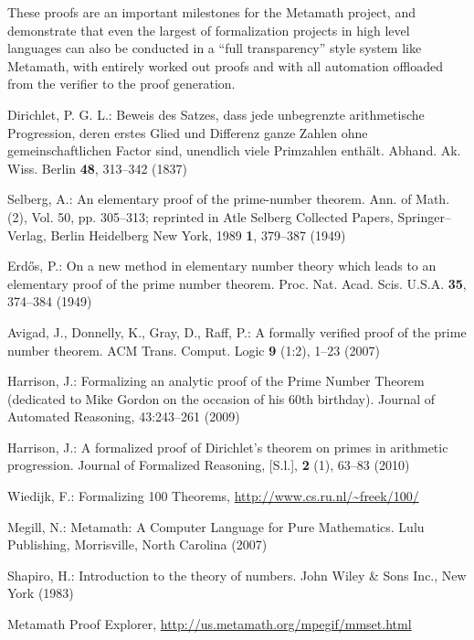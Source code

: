 \documentclass[runningheads,a4paper]{llncs}
\begin{document}
These proofs are an important milestones for the Metamath project, and demonstrate that even the largest of formalization projects in high level languages can also be conducted in a ``full transparency'' style system like Metamath, with entirely worked out proofs and with all automation offloaded from the verifier to the proof generation.


\begin{thebibliography}{4}
 Dirichlet, P. G. L.: Beweis des Satzes, dass jede unbegrenzte arithmetische Progression, deren erstes Glied und Differenz ganze Zahlen ohne gemeinschaftlichen Factor sind, unendlich viele Primzahlen enth\"{a}lt. Abhand. Ak. Wiss. Berlin {\bf 48}, 313--342 (1837)

 Selberg, A.: An elementary proof of the prime-number theorem. Ann. of Math. (2), Vol. 50, pp. 305--313; reprinted in Atle Selberg Collected Papers, Springer--Verlag, Berlin Heidelberg New York, 1989 {\bf 1}, 379--387 (1949)

 Erd\H{o}s, P.: On a new method in elementary number theory which leads to an elementary proof of the prime number theorem. Proc. Nat. Acad. Scis. U.S.A. {\bf 35}, 374--384 (1949)

 Avigad, J., Donnelly, K., Gray, D., Raff, P.: A formally verified proof of the prime number theorem. ACM Trans. Comput. Logic
{\bf 9} (1:2), 1--23 (2007)

 Harrison, J.: Formalizing an analytic proof of the Prime Number Theorem (dedicated to Mike Gordon on the occasion of his 60th birthday).
Journal of Automated Reasoning, 43:243--261 (2009)

 Harrison, J.: A formalized proof of Dirichlet's theorem on primes in arithmetic progression. Journal of Formalized Reasoning, [S.l.], {\bf 2} (1), 63--83 (2010)

 Wiedijk, F.: Formalizing 100 Theorems, \url{http://www.cs.ru.nl/~freek/100/}

 Megill, N.: Metamath: A Computer Language for Pure Mathematics. Lulu Publishing, Morrisville, North Carolina (2007)

 Shapiro, H.: Introduction to the theory of numbers. John Wiley \& Sons Inc., New York (1983)

 Metamath Proof Explorer, \url{http://us.metamath.org/mpegif/mmset.html}
\end{thebibliography}
\end{document}

